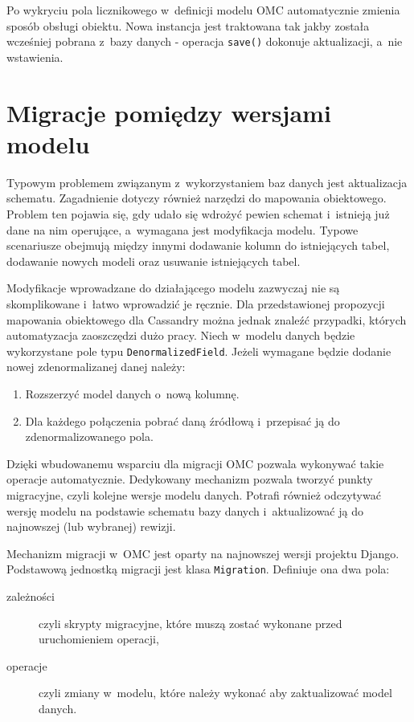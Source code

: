 Po wykryciu pola licznikowego w~definicji modelu OMC automatycznie zmienia sposób obsługi obiektu. Nowa instancja jest traktowana tak jakby została wcześniej pobrana z~bazy danych - operacja \verb+save()+ dokonuje aktualizacji, a~nie wstawienia. 

\section{Migracje pomiędzy wersjami modelu}
\label{sec:ocm_migrations}

Typowym problemem związanym z~wykorzystaniem baz danych jest aktualizacja schematu. Zagadnienie dotyczy również narzędzi do mapowania obiektowego. Problem ten pojawia się, gdy udało się wdrożyć pewien schemat i~istnieją już dane na nim operujące, a~wymagana jest modyfikacja modelu. Typowe scenariusze obejmują między innymi dodawanie kolumn do istniejących tabel, dodawanie nowych modeli oraz usuwanie istniejących tabel. 

Modyfikacje wprowadzane do działającego modelu zazwyczaj nie są skomplikowane i~łatwo wprowadzić je ręcznie. Dla przedstawionej propozycji mapowania obiektowego dla Cassandry można jednak znaleźć przypadki, których automatyzacja zaoszczędzi dużo pracy. Niech w~modelu danych będzie wykorzystane pole typu \verb+DenormalizedField+. Jeżeli wymagane będzie dodanie nowej zdenormalizanej danej należy:

\begin{enumerate}
	\item Rozszerzyć model danych o~nową kolumnę.
	\item Dla każdego połączenia pobrać daną źródłową i~przepisać ją do zdenormalizowanego pola.
\end{enumerate}

Dzięki wbudowanemu wsparciu dla migracji OMC pozwala wykonywać takie operacje automatycznie. Dedykowany mechanizm pozwala tworzyć punkty migracyjne, czyli kolejne wersje modelu danych. Potrafi również odczytywać wersję modelu na podstawie schematu bazy danych i~aktualizować ją do najnowszej (lub wybranej) rewizji.

Mechanizm migracji w~OMC jest oparty na najnowszej wersji projektu Django.~\cite{django_migrations} Podstawową jednostką migracji jest klasa \verb+Migration+. Definiuje ona dwa pola:

\begin{description}
	\item[zależności] czyli skrypty migracyjne, które muszą zostać wykonane przed uruchomieniem operacji,
	\item[operacje] czyli zmiany w~modelu, które należy wykonać aby zaktualizować model danych.
\end{description}

